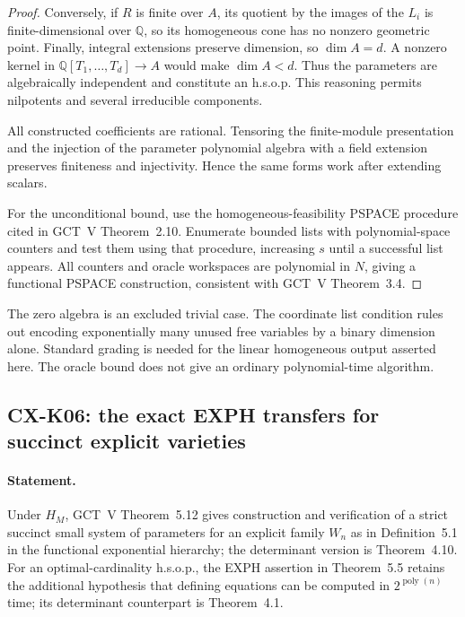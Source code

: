 \documentclass[11pt,a4paper]{article}
\begin{document}
\begin{proof}
Conversely, if $R$ is finite over $A$, its quotient by the images of
the $L_i$ is finite-dimensional over $\mathbb Q$, so its homogeneous
cone has no nonzero geometric point. Finally, integral extensions
preserve dimension, so $\dim A=d$. A nonzero kernel in
$\mathbb Q[T_1,\ldots,T_d]\to A$ would make $\dim A<d$.
Thus the parameters are algebraically independent and constitute an
h.s.o.p. This reasoning permits nilpotents and several irreducible
components.

All constructed coefficients are rational. Tensoring the finite-module
presentation and the injection of the parameter polynomial algebra
with a field extension preserves finiteness and injectivity. Hence
the same forms work after extending scalars.

For the unconditional bound, use the homogeneous-feasibility PSPACE
procedure cited in GCT~V Theorem~2.10. Enumerate bounded lists with
polynomial-space counters and test them using that procedure,
increasing $s$ until a successful list appears. All counters and
oracle workspaces are polynomial in $N$, giving a functional PSPACE
construction, consistent with GCT~V Theorem~3.4.
\end{proof}

The zero algebra is an excluded trivial case. The coordinate list
condition rules out encoding exponentially many unused free variables
by a binary dimension alone. Standard grading is needed for the
linear homogeneous output asserted here. The oracle bound does not
give an ordinary polynomial-time algorithm.

\subsection{CX-K06: the exact EXPH transfers for succinct explicit varieties}
\label{cx:k06}

\paragraph{Statement.}
Under $H_M$, GCT~V Theorem~5.12 gives construction and verification of
a strict succinct small system of parameters for an explicit family
$W_n$ as in Definition~5.1 in the functional exponential hierarchy;
the determinant version is Theorem~4.10. For an optimal-cardinality
h.s.o.p., the EXPH assertion in Theorem~5.5 retains the additional
hypothesis that defining equations can be computed in
$2^{\operatorname{poly}(n)}$ time; its determinant counterpart is
Theorem~4.1.
\end{document}
